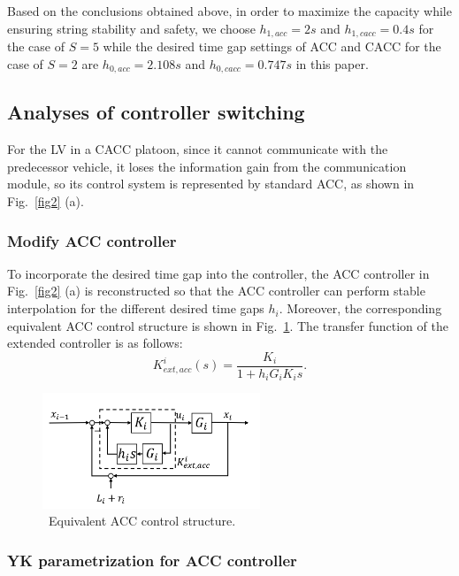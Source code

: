 \documentclass[trsc,nonblindrev]{informs3} %
\begin{document}
Based on the conclusions obtained above, in order to maximize the capacity while ensuring string stability and safety, we choose $h_{1,acc}=2s$ and $h_{1,cacc}=0.4s$ for the case of $S=5$ while the desired time gap settings of ACC and CACC for the case of $S=2$ are $h_{0,acc}=2.108s$ and $h_{0,cacc}=0.747s$ in this paper.

\subsection{Analyses of controller switching}
\label{Section 4.2}

For the LV in a CACC platoon, since it cannot communicate with the predecessor vehicle, it loses the information gain from the communication module, so its control system is represented by standard ACC, as shown in Fig.~\ref{fig2} (a).

\subsubsection{Modify ACC controller}
\label{Section 4.2.1}

To incorporate the desired time gap into the controller, the ACC controller in Fig.~\ref{fig2} (a) is reconstructed so that the ACC controller can perform stable interpolation for the different desired time gaps $h_i$. Moreover, the corresponding equivalent ACC control structure is shown in Fig.~\ref{fig5}. The transfer function of the extended controller is as follows:
\begin{equation}
    K_{e x t, a c c}^{i}(s)=\frac{K_{i}}{1+h_{i} G_{i} K_{i} s}.
\end{equation}
\begin{figure}
    \centering
    \includegraphics[width=6.5cm]{figs/fig5.png}
    \caption{~Equivalent ACC control structure.}
    \label{fig5}
\end{figure}

\subsubsection{YK parametrization for ACC controller}
\label{Section 4.2.2}
\end{document}
